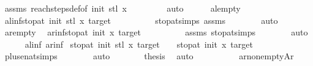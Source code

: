 \begin{isabellebody}
\ assms{\isacharparenleft}{\kern0pt}{}{\isacharparenright}{\kern0pt}\ reach{\isacharunderscore}{\kern0pt}steps{\isacharunderscore}{\kern0pt}def{\isacharbrackleft}{\kern0pt}of\ init{\isacharprime}{\kern0pt}\ {\isachardoublequoteopen}stl\ x{\isachardoublequoteclose}{\isacharbrackright}{\kern0pt}\ \isanewline
\ \ \ \ \ \ \isamarkupfalse%
\ auto\isanewline
\ \ \ \ \isamarkupfalse%
\ al{\isacharunderscore}{\kern0pt}empty\ \isamarkupfalse%
\ al{\isacharunderscore}{\kern0pt}inf{\isacharcolon}{\kern0pt}{\isachardoublequoteopen}stop{\isacharunderscore}{\kern0pt}at\ init{\isacharprime}{\kern0pt}\ {\isacharparenleft}{\kern0pt}stl\ x{\isacharparenright}{\kern0pt}\ target\ {\isacharequal}{\kern0pt}\ {\isasyminfinity}{\isachardoublequoteclose}\isanewline
\ \ \ \ \ \ \isamarkupfalse%
\ stop{\isacharunderscore}{\kern0pt}at{\isachardot}{\kern0pt}simps\ assms\isanewline
\ \ \ \ \ \ \isamarkupfalse%
\ auto\isanewline
\ \ \ \ \isamarkupfalse%
\ ar{\isacharunderscore}{\kern0pt}empty\ \isamarkupfalse%
\ ar{\isacharunderscore}{\kern0pt}inf{\isacharcolon}{\kern0pt}{\isachardoublequoteopen}stop{\isacharunderscore}{\kern0pt}at\ init\ x\ target\ {\isacharequal}{\kern0pt}\ {\isasyminfinity}{\isachardoublequoteclose}\isanewline
\ \ \ \ \ \ \isamarkupfalse%
\ assms\ stop{\isacharunderscore}{\kern0pt}at{\isachardot}{\kern0pt}simps\isanewline
\ \ \ \ \ \ \isamarkupfalse%
\ auto\isanewline
\ \ \ \ \isamarkupfalse%
\ al{\isacharunderscore}{\kern0pt}inf\ ar{\isacharunderscore}{\kern0pt}inf\ \isamarkupfalse%
{\isachardoublequoteopen}stop{\isacharunderscore}{\kern0pt}at\ init{\isacharprime}{\kern0pt}\ {\isacharparenleft}{\kern0pt}stl\ x{\isacharparenright}{\kern0pt}\ target\ {\isacharplus}{\kern0pt}\ {}\ {\isacharequal}{\kern0pt}\ stop{\isacharunderscore}{\kern0pt}at\ init\ x\ target{\isachardoublequoteclose}\isanewline
\ \ \ \ \ \ \isamarkupfalse%
\ plus{\isacharunderscore}{\kern0pt}enat{\isacharunderscore}{\kern0pt}simps\isanewline
\ \ \ \ \ \ \isamarkupfalse%
\ auto\isanewline
\ \ \ \ \isamarkupfalse%
\ \isamarkupfalse%
\ {\isacharquery}{\kern0pt}thesis\ \isamarkupfalse%
\ auto\isanewline
\ \ \isamarkupfalse%
\ \isanewline
\ \ \ \ \isamarkupfalse%
\ ar{\isacharunderscore}{\kern0pt}nonempty{\isacharcolon}{\kern0pt}{\isachardoublequoteopen}Ar\ {\isasymnoteq}\ {\isacharbraceleft}{\kern0pt}{\isacharbraceright}{\kern0pt}{\isachardoublequoteclose}\isanewline

\end{isabellebody}
